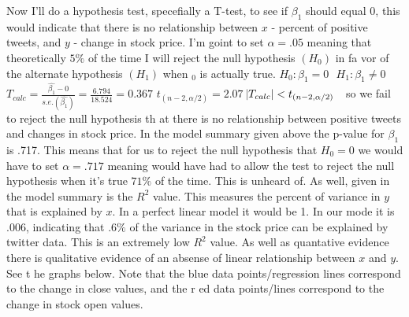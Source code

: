 \documentclass{acm_proc_article-sp}
\begin{document}
\begin{doublespace}
\indent Now I'll do a hypothesis test, specefially a T-test, to see if $\beta_1$ should equal 0, this would indicate
 that there is no relationship between $x$ - percent of positive tweets, and $y$ - change in stock price. I'm goint 
to set $\alpha = .05$ meaning that theoretically $5 \%$ of the time I will reject the null hypothesis $ (H_0)$ in fa
vor of the alternate hypothesis $(H_1)$ when $ _0$ is actually true. 
\newline\indent $ H_0: \beta_1 = 0 \ \ \ H_1: \beta_1 \neq 0$
\newline\indent\large $T_{calc} = \frac{ \hat{\beta_1} - 0 }{s.e.(\hat{\beta_1})} = \frac{6.794}{18.524} = 0.367 $
\newline\indent $ t_{ (n-2,\alpha/2)} = 2.07$
\newline\indent $ \abs{T_{calc}} < t_{ (n-2,\alpha/2)} \ \ $ \normalsize so we fail to reject the null hypothesis th
at there is no relationship between positive tweets and changes in stock price.
\newline\indent In the model summary given above the p-value for $\beta_1$ is .717. This means that for us to reject
 the null hypothesis that $H_0 =0$ we would have to set $\alpha = .717$ meaning would have had to allow the test to 
reject the null hypothesis when it's true $71 \%$ of the time. This is unheard of.
\newline\indent As well, given in the model summary is the $R^2$ value. This measures the percent of variance in $y$
 that is explained by $x$. In a perfect linear model it would be 1. In our mode it is $.006$, indicating that $.6\%$
 of the variance in the stock price can be explained by twitter data. This is an extremely low $R^2$ value. As well 
as quantative evidence there is qualitative evidence of an absense of linear relationship between $x$ and $y$. See t
he graphs below. Note that the blue data points/regression lines correspond to the change in close values, and the r
ed data points/lines correspond to the change in stock open values.

\end{doublespace}
\end{document}
